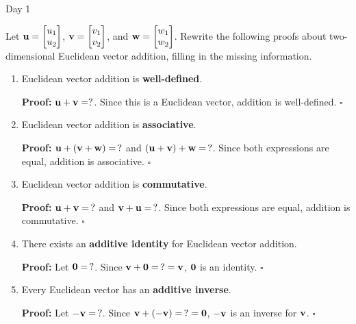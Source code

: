 
\begin{applicationActivities}{Day 1}


\begin{activity}{15}
Let \(\mathbf u=\begin{bmatrix} u_1 \\ u_2 \end{bmatrix}\),
\(\mathbf v=\begin{bmatrix} v_1 \\ v_2 \end{bmatrix}\), and
\(\mathbf w=\begin{bmatrix} w_1 \\ w_2 \end{bmatrix}\).
Rewrite the following proofs about two-dimensional Euclidean vector addition,
filling in the missing information.
\begin{enumerate}
  \item Euclidean vector addition is \textbf{well-defined}.

        \textbf{Proof:} \(\mathbf u+\mathbf v=?\). Since this is a Euclidean
        vector, addition is well-defined. \(\square\)
  \item Euclidean vector addition is \textbf{associative}.

        \textbf{Proof:} \(\mathbf u+(\mathbf v+\mathbf w)=\,?\) and
        \((\mathbf u+\mathbf v)+\mathbf w=\,?\). Since both expressions are equal,
        addition is associative. \(\square\)
  \item Euclidean vector addition is \textbf{commutative}.

        \textbf{Proof:} \(\mathbf u+\mathbf v=\,?\) and
        \(\mathbf v+\mathbf u=\,?\). Since both expressions are equal,
        addition is commutative. \(\square\)
  \item There exists an \textbf{additive identity} for Euclidean vector
        addition.

        \textbf{Proof:} Let \(\mathbf 0=\,?\). Since
        \(\mathbf v+\mathbf 0=\,?=\mathbf v\), \(\mathbf 0\) is an identity. \(\square\)
  \item Every Euclidean vector has an \textbf{additive inverse}.

        \textbf{Proof:} Let \(-\mathbf v=\,?\). Since
        \(\mathbf v+(-\mathbf v)=\,?=\mathbf 0\), \(-\mathbf v\) is an inverse
        for \(\mathbf v\). \(\square\)
\end{enumerate}
\end{activity}


\end{applicationActivities}
